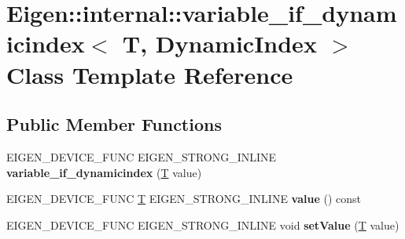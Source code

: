 \hypertarget{class_eigen_1_1internal_1_1variable__if__dynamicindex_3_01_t_00_01_dynamic_index_01_4}{}\section{Eigen\+:\+:internal\+:\+:variable\+\_\+if\+\_\+dynamicindex$<$ T, Dynamic\+Index $>$ Class Template Reference}
\label{class_eigen_1_1internal_1_1variable__if__dynamicindex_3_01_t_00_01_dynamic_index_01_4}
\subsection*{Public Member Functions}
\begin{DoxyCompactItemize}
\item 
\mbox{\label{class_eigen_1_1internal_1_1variable__if__dynamicindex_3_01_t_00_01_dynamic_index_01_4_a8c8e077721a51797efde13a37e49c376}} 
E\+I\+G\+E\+N\+\_\+\+D\+E\+V\+I\+C\+E\+\_\+\+F\+U\+NC E\+I\+G\+E\+N\+\_\+\+S\+T\+R\+O\+N\+G\+\_\+\+I\+N\+L\+I\+NE {\bfseries variable\+\_\+if\+\_\+dynamicindex} (\hyperlink{group___sparse_core___module}{T} value)
\item 
\mbox{\label{class_eigen_1_1internal_1_1variable__if__dynamicindex_3_01_t_00_01_dynamic_index_01_4_a355b9b89ad0e85e71e392a015c9e9fca}} 
E\+I\+G\+E\+N\+\_\+\+D\+E\+V\+I\+C\+E\+\_\+\+F\+U\+NC \hyperlink{group___sparse_core___module}{T} E\+I\+G\+E\+N\+\_\+\+S\+T\+R\+O\+N\+G\+\_\+\+I\+N\+L\+I\+NE {\bfseries value} () const
\item 
\mbox{\label{class_eigen_1_1internal_1_1variable__if__dynamicindex_3_01_t_00_01_dynamic_index_01_4_a486ec15d3596b14d8cab8da5aed14eea}} 
E\+I\+G\+E\+N\+\_\+\+D\+E\+V\+I\+C\+E\+\_\+\+F\+U\+NC E\+I\+G\+E\+N\+\_\+\+S\+T\+R\+O\+N\+G\+\_\+\+I\+N\+L\+I\+NE void {\bfseries set\+Value} (\hyperlink{group___sparse_core___module}{T} value)
\item 
\mbox{\label{class_eigen_1_1internal_1_1variable__if__dynamicindex_3_01_t_00_01_dynamic_index_01_4_a8c8e077721a51797efde13a37e49c376}} 

\end{DoxyCompactItemize}
